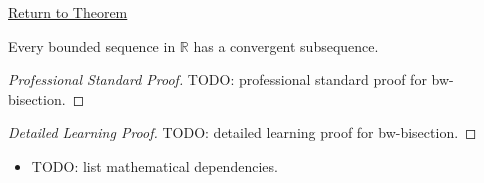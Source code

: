 \newpage
{}
\label{prf:bw-bisection}

\begin{remark*}[Return]
\hyperref[prop:bw-bisection]{Return to Theorem}
\end{remark*}

\begin{proposition*}
Every bounded sequence in $\mathbb{R}$ has a convergent subsequence.
\end{proposition*}

\begin{proof}[Professional Standard Proof]
\LRAProofBodyStart
TODO: professional standard proof for bw-bisection.
\end{proof}

\begin{proof}[Detailed Learning Proof]
\LRAProofBodyStart
TODO: detailed learning proof for bw-bisection.
\end{proof}

\begin{remark*}
\end{remark*}

\begin{dependencies}
\begin{itemize}
  \item TODO: list mathematical dependencies.
\end{itemize}
\end{dependencies}

\clearpage
